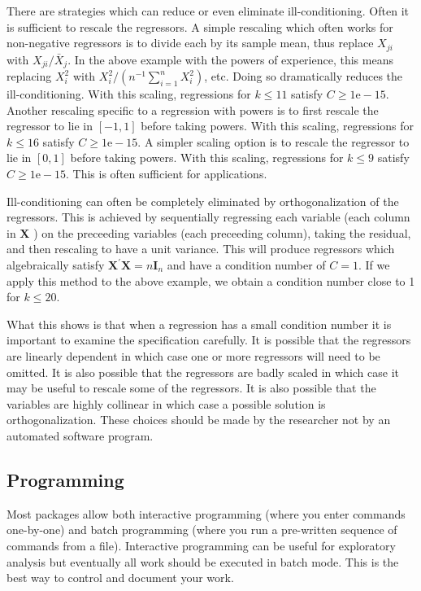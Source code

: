 \documentclass[10pt]{article}
\begin{document}
There are strategies which can reduce or even eliminate ill-conditioning. Often it is sufficient to rescale the regressors. A simple rescaling which often works for non-negative regressors is to divide each by its sample mean, thus replace $X_{j i}$ with $X_{j i} / \bar{X}_{j}$. In the above example with the powers of experience, this means replacing $X_{i}^{2}$ with $X_{i}^{2} /\left(n^{-1} \sum_{i=1}^{n} X_{i}^{2}\right)$, etc. Doing so dramatically reduces the ill-conditioning. With this scaling, regressions for $k \leq 11$ satisfy $C \geq 1 \mathrm{e}-15$. Another rescaling specific to a regression with powers is to first rescale the regressor to lie in $[-1,1]$ before taking powers. With this scaling, regressions for $k \leq 16$ satisfy $C \geq 1 \mathrm{e}-15$. A simpler scaling option is to rescale the regressor to lie in $[0,1]$ before taking powers. With this scaling, regressions for $k \leq 9$ satisfy $C \geq 1 \mathrm{e}-15$. This is often sufficient for applications.

Ill-conditioning can often be completely eliminated by orthogonalization of the regressors. This is achieved by sequentially regressing each variable (each column in $\boldsymbol{X}$ ) on the preceeding variables (each preceeding column), taking the residual, and then rescaling to have a unit variance. This will produce regressors which algebraically satisfy $\boldsymbol{X}^{\prime} \boldsymbol{X}=n \boldsymbol{I}_{n}$ and have a condition number of $C=1$. If we apply this method to the above example, we obtain a condition number close to 1 for $k \leq 20$.

What this shows is that when a regression has a small condition number it is important to examine the specification carefully. It is possible that the regressors are linearly dependent in which case one or more regressors will need to be omitted. It is also possible that the regressors are badly scaled in which case it may be useful to rescale some of the regressors. It is also possible that the variables are highly collinear in which case a possible solution is orthogonalization. These choices should be made by the researcher not by an automated software program.

\subsection{Programming}
Most packages allow both interactive programming (where you enter commands one-by-one) and batch programming (where you run a pre-written sequence of commands from a file). Interactive programming can be useful for exploratory analysis but eventually all work should be executed in batch mode. This is the best way to control and document your work.
\end{document}
